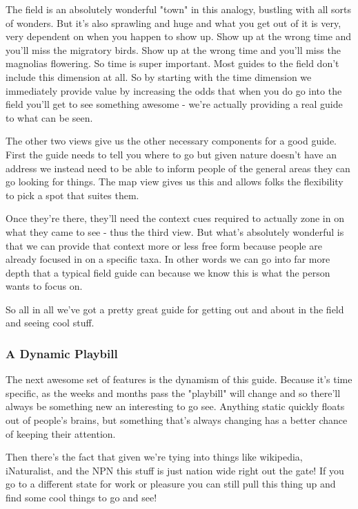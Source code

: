 \documentclass[10pt,a5paper]{book}
\begin{document}
The field is an absolutely wonderful "town" in this analogy, bustling with all sorts of wonders. But it's also sprawling and huge and what you get out of it is very, very dependent on when you happen to show up. Show up at the wrong time and you'll miss the migratory birds. Show up at the wrong time and you'll miss the magnolias flowering. So time is super important. Most guides to the field don't include this dimension at all. So by starting with the time dimension we immediately provide value by increasing the odds that when you do go into the field you'll get to see something awesome - we're actually providing a real guide to what can be seen.

The other two views give us the other necessary components for a good guide. First the guide needs to tell you where to go but given nature doesn't have an address we instead need to be able to inform people of the general areas they can go looking for things. The map view gives us this and allows folks the flexibility to pick a spot that suites them. 

Once they're there, they'll need the context cues required to actually zone in on what they came to see - thus the third view. But what's absolutely wonderful is that we can provide that context more or less free form because people are already focused in on a specific taxa. In other words we can go into far more depth that a typical field guide can because we know this is what the person wants to focus on. 

So all in all we've got a pretty great guide for getting out and about in the field and seeing cool stuff.

\subsubsection{A Dynamic Playbill}
The next awesome set of features is the dynamism of this guide. Because it's time specific, as the weeks and months pass the "playbill" will change and so there'll always be something new an interesting to go see. Anything static quickly floats out of people's brains, but something that's always changing has a better chance of keeping their attention. 

Then there's the fact that given we're tying into things like wikipedia, iNaturalist, and the NPN this stuff is just nation wide right out the gate! If you go to a different state for work or pleasure you can still pull this thing up and find some cool things to go and see!
\end{document}
